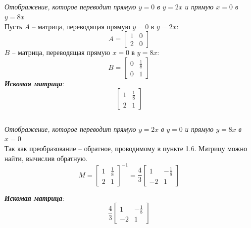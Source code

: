 \documentclass[a5paper, 10pt]{article}
\theoremstyle{definition}
\theoremstyle{plain}
\theoremstyle{remark}
\begin{document}
\subsection{}
\textit{Отображение, которое переводит прямую $y=0$ в $y=2x$ и прямую $x=0$ в $y=8x$}\\
Пусть $A$ -- матрица, переводящая прямую $y=0$ в $y=2x$:
\begin{equation}
A=
\begin{bmatrix}
1 & 0\\
2 & 0
\end{bmatrix}
\end{equation}
$B$ -- матрица, переводящая прямую $x=0$ в $y=8x$:
\begin{equation}
B=
\begin{bmatrix}
0 & \frac{1}{8}\\
0 & 1
\end{bmatrix}
\end{equation}
\textit{\textbf{Искомая матрица}}:
\begin{equation}
\begin{bmatrix}
1 &  \frac{1}{8}\\
2 & 1
\end{bmatrix}
\end{equation}


\subsection{}
\textit{Отображение, которое переводит прямую $y=2x$ в $y=0$  и прямую $y=8x$ в $x=0$}\\
Так как преобразование -- обратное, проводимому в пункте 1.6. Матрицу можно найти, вычислив обратную.
\begin{equation}
M = 
\begin{bmatrix}
1 &  \frac{1}{8}\\
2 & 1
\end{bmatrix}^{-1}
=
\frac{4}{3} 
\begin{bmatrix}
1 &  -\frac{1}{8}\\
-2 & 1
\end{bmatrix}
\end{equation}

\textit{\textbf{Искомая матрица}}:
\begin{equation}
\frac{4}{3}
\begin{bmatrix}
1 &  -\frac{1}{8}\\
-2 & 1
\end{bmatrix}
\end{equation}
\end{document}
